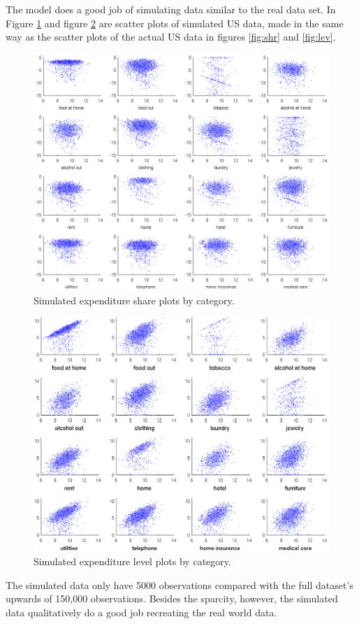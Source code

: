 \documentclass[12pt]{article}
\begin{document}
The model does a good job of simulating data similar to the real data set. In Figure \ref{fig:shares_fake} and figure \ref{fig:levels_fake} are scatter plots of simulated US data, made in the same way as the scatter plots of the actual US data in figures \ref{fig:shr} and \ref{fig:lev}. 
\begin{figure}
	\centering
		\includegraphics[scale=1]{pics/shares_fake_cropped.pdf}
	\caption{Simulated expenditure share plots by category.}
	\label{fig:shares_fake}
\end{figure}
\begin{figure}
    \centering
	\includegraphics[scale=1]{pics/levels_fake_cropped.pdf}
    \caption{Simulated expenditure level plots by category.}
    \label{fig:levels_fake}
\end{figure}
The simulated data only have 5000 observations compared with the full dataset's upwards of 150,000 observations. 
Besides the sparcity, however, the simulated data qualitatively do a good job recreating the real world data.
\end{document}
